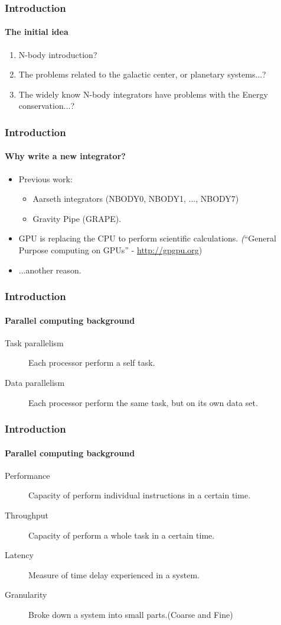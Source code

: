 \begin{frame}
    \frametitle{Introduction}
    \framesubtitle{The initial idea}
    \begin{enumerate}
        \item N-body introduction?
        \item The problems related to the galactic center,
              or planetary systems...?
        \item The widely know N-body integrators have problems
              with the Energy conservation...?
    \end{enumerate}
\end{frame}

\begin{frame}
    \frametitle{Introduction}
    \framesubtitle{Why write a new integrator?}
    \begin{itemize}
            \item Previous work:
            \begin{itemize}
                \item Aarseth integrators (NBODY0, NBODY1, ..., NBODY7)
                \item Gravity Pipe (GRAPE).
            \end{itemize}
            \item GPU is replacing the CPU to perform scientific calculations.
                 \emph(``General Purpose computing on GPUs'' - \url{http://gpgpu.org})
            \item ...another reason.
    \end{itemize}
\end{frame}

\begin{frame}
    \frametitle{Introduction}
    \framesubtitle{Parallel computing background}
    \begin{description}
        \item[Task parallelism]
            Each processor perform a self task.
        \item[Data parallelism]
            Each processor perform the same task, but on its own data set.
    \end{description}
\end{frame}

\begin{frame}
    \frametitle{Introduction}
    \framesubtitle{Parallel computing background}
    \begin{description}
        \item[Performance]
                Capacity of perform individual instructions in a certain time.
        \item[Throughput]
                Capacity of perform a whole task in a certain time.
        \item[Latency]
                Measure of time delay experienced in a system.
        \item[Granularity]
                Broke down a system into small parts.(Coarse and Fine)
    \end{description}
\end{frame}

